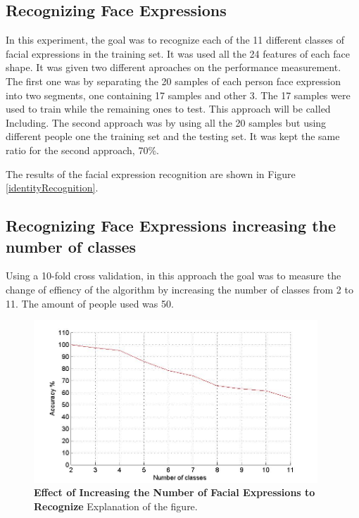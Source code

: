 \documentclass[]{article}
\begin{document}
\subsection{Recognizing Face Expressions}

In this experiment, the goal was to recognize each of the 11 different classes of facial expressions in the training
set. It was used all the 24 features of each face shape. It was
 given two different aproaches on the performance measurement. The first one was by separating the 20 samples of each
 person face expression into two segments, one containing 17 samples and other 3. The 17 samples were used to train
 while the remaining ones to test. This approach will be called Including. The second approach was by using all the 20
 samples but using different people one the training set and the testing set. It was kept the same ratio for the second
 approach, 70\%.
 

The results of the facial expression recognition  are shown in Figure
\ref{identityRecognition}.
 
\subsection{Recognizing Face Expressions increasing the number of classes}

Using a 10-fold cross validation, in this approach the goal was to measure the
change of effiency of the algorithm by increasing the number of classes from 2
to 11. The amount of people used was 50.

\begin{figure}[ht]
\begin{center}
\vspace{-3mm}
\includegraphics[width=0.95\textwidth]{figures/50people_increasing_classes.jpg}
\end{center}
\caption{\textbf{Effect of Increasing the Number of Facial Expressions to Recognize} Explanation of the figure.}
\label{increasingNumberExpressions}
\end{figure}
\end{document}
